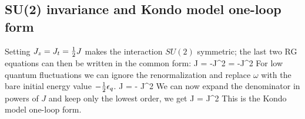 \documentclass[12pt,twoside]{report}
\numberwithin{equation}{section}
\begin{document}
\subsection{SU(2) invariance and Kondo model one-loop form}
Setting \(J_z = J_t = \frac{1}{2} J\) makes the interaction \(SU(2)\) symmetric; the last two RG equations can then be written in the common form:
\beq
\Delta J = -J^2 = -J^2
\eeq
For low quantum fluctuations we can ignore the renormalization and replace \(\omega\) with the bare initial energy value \(-\frac{1}{2}\epsilon_q\).
\beq
\Delta J = - J^2 
\eeq
We can now expand the denominator in powers of \(J\) and keep only the lowest order, we get
\beq
\Delta J = J^2 
\eeq
This is the Kondo model one-loop form.
\end{document}

